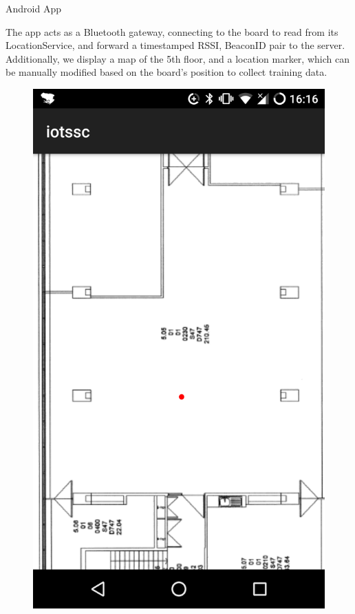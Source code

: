 \documentclass[landscape]{infslides}
\begin{document}
\begin{slide}{Android App}
    \thispagestyle{nofooter}
    \begin{multicols}{2}
        The app acts as a Bluetooth gateway, connecting to the board to read from its LocationService, and forward a timestamped RSSI, BeaconID pair to the server.\\
        Additionally, we display a map of the 5th floor, and a location marker, which can be manually modified based on the board's position to collect training data.
        \begin{figure}
            \includegraphics[scale=0.2,right]{Screenshot.png}
        \end{figure}
    \end{multicols}
\end{slide}
\end{document}
